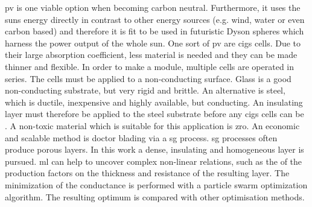 \Gls{pv} is one viable option when becoming carbon neutral. 
Furthermore, 
it uses the suns energy directly in contrast to other energy sources (e.g. wind, water or even carbon based) and therefore 
it is fit to be used in futuristic Dyson spheres\cite{dyson1960search} which harness the power output of the whole sun.
%
One sort of \gls{pv} are \gls{cigs}\cite{Vasekar2010} cells. 
Due to their large absorption coefficient, less material is needed and they can be made thinner and flexible. 
In order to make a module, multiple cells are operated in series. 
The cells must be applied to a non-conducting surface.
Glass is a good non-conducting substrate, but very rigid and brittle. 
An alternative is steel, which is ductile, inexpensive and highly available, but conducting. 
An insulating layer must therefore be applied to the steel substrate before any \gls{cigs} cells can be .
A non-toxic material which is suitable for this application is \gls{zro}. 
An economic and scalable method is doctor blading via a \gls{sg} process. 
\gls{sg} processes often produce porous layers. 
In this work a dense, insulating and homogeneous layer is pursued. 
\Gls{ml} can help to uncover complex non-linear relations, such as the  of the 
production factors on the thickness and resistance of the resulting layer.
The minimization of the conductance is performed with a particle swarm optimization 
algorithm. 
The resulting optimum is compared with other optimisation methods.
